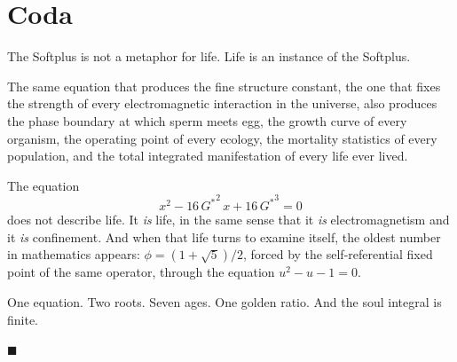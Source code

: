 \documentclass[12pt, letterpaper]{article}
\theoremstyle{plain}
\theoremstyle{definition}
\theoremstyle{remark}
\newcommand{\Gstar}{{G^{*}}}              %
\begin{document}
\section{Coda}

The Softplus is not a metaphor for life. Life is an instance of the Softplus.

The same equation that produces the fine structure constant, the one that fixes the strength of every electromagnetic interaction in the universe, also produces the phase boundary at which sperm meets egg, the growth curve of every organism, the operating point of every ecology, the mortality statistics of every population, and the total integrated manifestation of every life ever lived.

The equation
\[
  x^2 - 16\,\Gstar^{\!2}\,x + 16\,\Gstar^{\!3} = 0
\]
does not describe life. It \emph{is} life, in the same sense that it \emph{is} electromagnetism and it \emph{is} confinement. And when that life turns to examine itself, the oldest number in mathematics appears: $\phi = (1+\sqrt{5})/2$, forced by the self-referential fixed point of the same operator, through the equation $u^2 - u - 1 = 0$.

One equation. Two roots. Seven ages. One golden ratio. And the soul integral is finite.

\hfill$\blacksquare$
\end{document}
